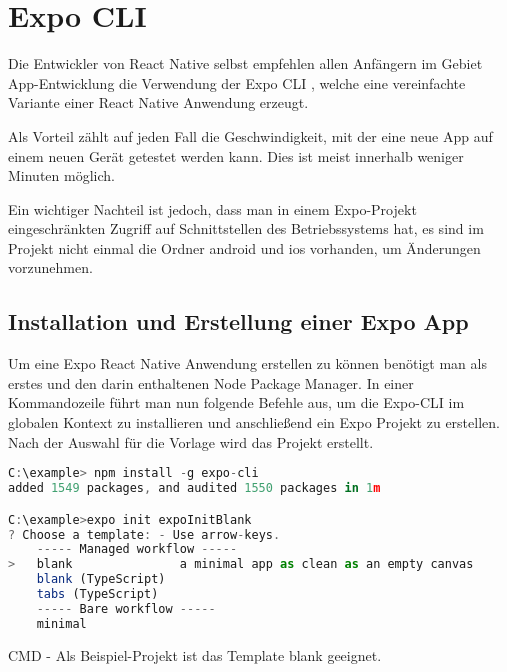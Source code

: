 \section{Expo CLI}
\label{expocli}
Die Entwickler von React Native selbst empfehlen allen Anfängern im Gebiet App-Entwicklung die
Verwendung der Expo CLI \cite{expocli}, welche eine vereinfachte Variante einer React Native Anwendung erzeugt.

Als Vorteil zählt auf jeden Fall die Geschwindigkeit, mit der eine neue App auf einem neuen Gerät
getestet werden kann. Dies ist meist innerhalb weniger Minuten möglich.

Ein wichtiger Nachteil ist jedoch, dass man in einem Expo-Projekt eingeschränkten Zugriff auf
Schnittstellen des Betriebssystems hat, es sind im Projekt nicht einmal die Ordner android und ios
vorhanden, um Änderungen vorzunehmen.

\subsection{Installation und Erstellung einer Expo App}
Um eine Expo React Native Anwendung erstellen zu können benötigt man als erstes  und
den darin enthaltenen Node Package Manager. In einer Kommandozeile führt man nun folgende Befehle
aus, um die Expo-CLI im globalen Kontext zu installieren und anschließend ein Expo Projekt zu
erstellen. Nach der Auswahl für die Vorlage wird das Projekt erstellt.


\begin{code}[htp]
\begin{lstlisting}[firstnumber=1,language=JavaScript, style=CMD]
C:\example> npm install -g expo-cli
added 1549 packages, and audited 1550 packages in 1m

C:\example>expo init expoInitBlank
? Choose a template: - Use arrow-keys.
    ----- Managed workflow -----
>   blank               a minimal app as clean as an empty canvas
    blank (TypeScript)
    tabs (TypeScript)
    ----- Bare workflow -----
    minimal
\end{lstlisting}
\caption{CMD - Als Beispiel-Projekt ist das Template blank geeignet.}
\end{code}


